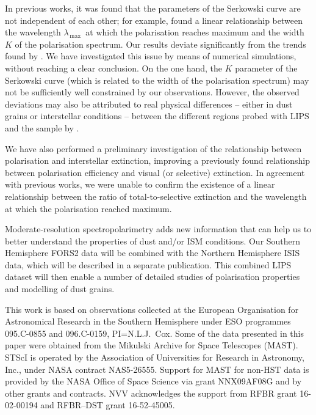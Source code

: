 \documentclass[a4paper]{aa}
\newcommand{\lmax}{\ensuremath{\lambda_\mathrm{\,max}}}
\begin{document}
In previous works, it was found that the parameters of the Serkowski
curve are not independent of each other; for example, \citet{Whietal92} found
a linear relationship between the wavelength \lmax\ at which the
polarisation reaches maximum and the width $K$ of the polarisation
spectrum. Our results deviate significantly from the trends found by
\citet{Whietal92}. We have investigated this issue by means of
numerical simulations, without reaching a clear conclusion. On the
one hand, the $K$ parameter of the Serkowski curve (which is related
to the width of the polarisation spectrum) may not be sufficiently
well constrained by our observations. However, the observed deviations
may also be attributed to real physical differences -- either in dust
grains or interstellar conditions -- between the different regions
probed with LIPS and the sample by \citet{Whietal92}.

We have also performed a preliminary investigation of the relationship
between polarisation and interstellar extinction, improving a
previously found relationship between polarisation efficiency and
visual (or selective) extinction. In agreement with previous works, we
 were unable to confirm the existence of a linear relationship between the
ratio of total-to-selective extinction and the wavelength at which the
polarisation reached maximum.

Moderate-resolution spectropolarimetry adds new information that can
help us to better understand the properties of dust and/or ISM
conditions. Our Southern Hemisphere FORS2 data will be combined with
the Northern Hemisphere ISIS data, which will be described in a
separate publication. This combined LIPS dataset will then enable a
number of detailed studies of polarisation properties and modelling of
dust grains.

\begin{acknowledgements}
This work is based on observations collected at the European
Organisation for Astronomical Research in the Southern Hemisphere
under ESO programmes 095.C-0855 and 096.C-0159, PI=N.L.J.\ Cox.
Some of the data presented in this paper were obtained from the
Mikulski Archive for Space Telescopes (MAST). STScI is operated by the
Association of Universities for Research in Astronomy, Inc., under
NASA contract NAS5-26555. Support for MAST for non-HST data is
provided by the NASA Office of Space Science via grant NNX09AF08G and
by other grants and contracts. NVV acknowledges the support from RFBR
grant 16-02-00194 and RFBR–DST grant 16-52-45005.

\end{acknowledgements}
\end{document}
